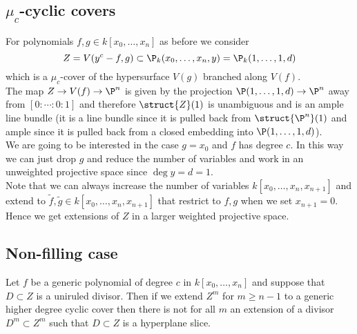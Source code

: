 \documentclass[12pt]{article}
\theoremstyle{plain}
\begin{document}
\subsection{$\mu_c$-cyclic covers}

For polynomials $f,g \in k[x_0, \dots, x_n]$ as before we consider
\[ Z = V(y^c - f, g) \subset \P_k(x_0, \dots, x_n, y) = \P_k(1, \dots, 1, d) \]
which is a $\mu_c$-cover of the hypersurface $V(g)$ branched along $V(f)$. 
\bigskip\\
The map $Z \to V(f) \to \P^n$ is given by the projection $\P(1,\dots,1,d) \to \P^n$ away from $[0 : \cdots : 0 : 1]$ and therefore $\struct{Z}(1)$ is unambiguous and is an ample line bundle (it is a line bundle since it is pulled back from $\struct{\P^n}(1)$ and ample since it is pulled back from a closed embedding into $\P(1,\dots,1, d)$). 
\bigskip\\
We are going to be interested in the case $g = x_0$ and $f$ has degree $c$. In this way we can just drop $g$ and reduce the number of variables and work in an unweighted projective space since $\deg{y} = d = 1$. 
\bigskip\\
Note that we can always increase the number of variables $k[x_0, \dots, x_n, x_{n+1}]$ and extend to $\tilde{f}, \tilde{g} \in k[x_0, \dots, x_{n}, x_{n+1}]$ that restrict to $f,g$ when we set $x_{n+1} = 0$. Hence we get extensions of $Z$ in a larger weighted projective space. 

\subsection{Non-filling case}

Let $f$ be a generic polynomial of degree $c$ in $k[x_0, \dots, x_n]$ and suppose that $D \subset Z$ is a uniruled divisor. Then if we extend $Z^m$ for $m \ge n-1$ to a generic higher degree cyclic cover then there is not for all $m$ an extension of a divisor $D^m \subset Z^m$ such that $D \subset Z$ is a hyperplane slice. 
\end{document}

